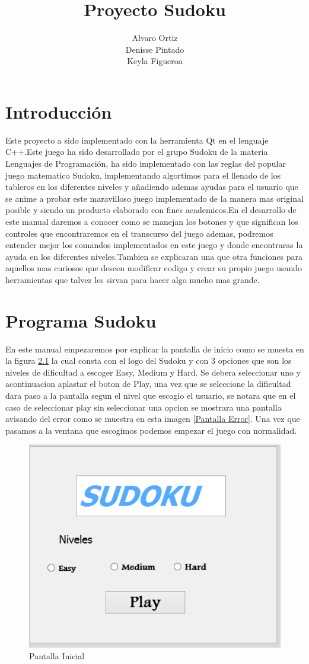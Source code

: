 \documentclass[12pt,oneside]{book}
\title{Proyecto Sudoku}
\author{Alvaro Ortiz\\ Denisse Pintado\\ Keyla Figueroa}
\begin{document}
\maketitle
\tableofcontents

\chapter{Introducción}
Este proyecto a sido implementado con la herramienta Qt en el lenguaje C++.Este juego ha sido desarrollado por el grupo Sudoku de la materia Lenguajes de Programación, ha sido implementado con las reglas del popular  juego matematico Sudoku, implementando algortimos para el llenado de los tableros en  los diferentes niveles y añadiendo ademas ayudas para el usuario que se anime a probar este maravilloso juego implementado de la manera mas original posible y siendo un producto elaborado con fines academicos.En el desarrollo de este manual daremos a conocer como se manejan los botones y que significan los controles que encontraremos en el transcurso del juego ademas, podremos entender mejor los comandos implementados en este juego y donde encontraras la ayuda en los diferentes niveles.Tambien se explicaran una que otra funciones para aquellos mas curiosos que deseen modificar codigo y crear su propio juego usando herramientas que talvez les sirvan para hacer algo mucho mas grande.

\chapter{Programa Sudoku}

En este manual empezaremos por explicar la pantalla de inicio como se muesta en la figura  \ref{Pantalla Inicial} la cual consta con el logo del Sudoku y con 3 opciones que son los niveles de dificultad a escoger Easy, Medium y Hard. Se debera seleccionar uno y acontinuacion aplastar el boton de Play, una vez que se seleccione la dificultad dara paso a la pantalla segun el nivel que escogio el usuario, se notara que en el caso de seleccionar play sin seleccionar una opcion se mostrara una  pantalla avisando del error como se muestra en esta imagen \ref{Pantalla Error}. Una vez que pasamos a la ventana que escogimos podemos empezar el juego con normalidad.

\begin{figure}[htbp]
\begin{center}
\includegraphics[width=.60\textwidth]{./imagenes/Pantalla Inicial.png}
\caption{Pantalla Inicial}
\label{Pantalla Inicial}
\end{center}
\end{figure}
\end{document}
